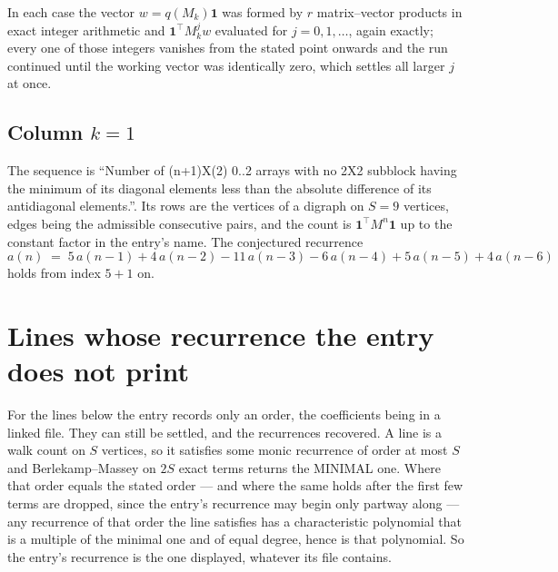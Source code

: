 \documentclass[11pt,a4paper]{article}
\theoremstyle{plain}
\theoremstyle{definition}
\begin{document}
In each case the vector $w=q(M_k)\mathbf{1}$ was formed by $r$ matrix--vector products in
exact integer arithmetic and $\mathbf{1}^{\!\top}M_k^{j}w$ evaluated for $j=0,1,\dots$,
again exactly; every one of those integers vanishes from the stated point onwards and the run
continued until the working vector was identically zero, which settles all larger $j$ at once.

\subsection*{Column $k$$=1$}
The sequence is ``Number of (n+1)X(2) 0..2 arrays with no 2X2 subblock having the minimum of its diagonal elements less than the absolute difference of its antidiagonal elements.''. Its rows are the vertices of a digraph on
$S=9$ vertices, edges being the admissible consecutive pairs, and the count is
$\mathbf{1}^{\!\top}M^{n}\mathbf{1}$ up to the constant factor in the entry's name.
The conjectured recurrence
\[
a(n)\;=\;5\,a(n-1) + 4\,a(n-2) - 11\,a(n-3) - 6\,a(n-4) + 5\,a(n-5) + 4\,a(n-6)
\]
holds from index $5+1$ on.


\section{Lines whose recurrence the entry does not print}

For the lines below the entry records only an order, the coefficients being in a linked file.
They can still be settled, and the recurrences recovered. A line is a walk count on $S$
vertices, so it satisfies some monic recurrence of order at most $S$ and Berlekamp--Massey on
$2S$ exact terms returns the MINIMAL one. Where that order equals the stated order --- and
where the same holds after the first few terms are dropped, since the entry's recurrence may
begin only partway along --- any recurrence of that order the line satisfies has a
characteristic polynomial that is a multiple of the minimal one and of equal degree, hence is
that polynomial. So the entry's recurrence is the one displayed, whatever its file contains.
\end{document}
